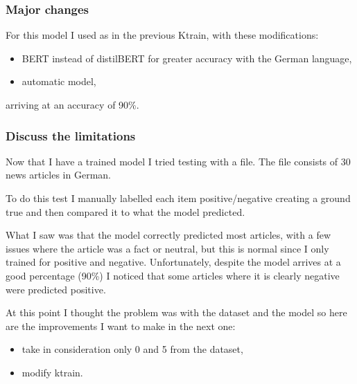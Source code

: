 \subsubsection{Major changes}
For this model I used as in the previous Ktrain, with these modifications:
\begin{itemize}
    \item BERT instead of distilBERT for greater accuracy with the German language,
    \item automatic model,
\end{itemize}
arriving at an accuracy of 90\%.

\subsubsection{Discuss the limitations} 
Now that I have a trained model I tried testing with a file. The file consists of 30 news articles in German.

To do this test I manually labelled each item positive/negative creating a ground true and then compared it to what the model predicted.

What I saw was that the model correctly predicted most articles, with a few issues where the article was a fact or neutral, but this is normal since I only trained for positive and negative.
Unfortunately, despite the model arrives at a good percentage (90\%) I noticed that some articles where it is clearly negative were predicted positive. 

At this point I thought the problem was with the dataset and the model so here are the improvements I want to make in the next one:
\begin{itemize}
    \item take in consideration only 0 and 5 from the dataset,
    \item modify ktrain.
\end{itemize}